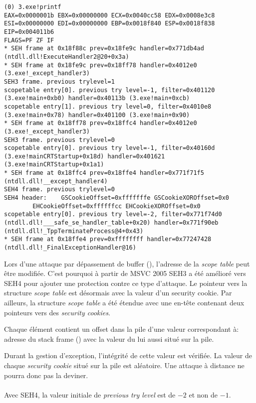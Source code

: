 \begin{lstlisting}[caption=tracer.exe output]
(0) 3.exe!printf
EAX=0x0000001b EBX=0x00000000 ECX=0x0040cc58 EDX=0x0008e3c8
ESI=0x00000000 EDI=0x00000000 EBP=0x0018f840 ESP=0x0018f838
EIP=0x004011b6
FLAGS=PF ZF IF
* SEH frame at 0x18f88c prev=0x18fe9c handler=0x771db4ad (ntdll.dll!ExecuteHandler2@20+0x3a)
* SEH frame at 0x18fe9c prev=0x18ff78 handler=0x4012e0 (3.exe!_except_handler3)
SEH3 frame. previous trylevel=1
scopetable entry[0]. previous try level=-1, filter=0x401120 (3.exe!main+0xb0) handler=0x40113b (3.exe!main+0xcb)
scopetable entry[1]. previous try level=0, filter=0x4010e8 (3.exe!main+0x78) handler=0x401100 (3.exe!main+0x90)
* SEH frame at 0x18ff78 prev=0x18ffc4 handler=0x4012e0 (3.exe!_except_handler3)
SEH3 frame. previous trylevel=0
scopetable entry[0]. previous try level=-1, filter=0x40160d (3.exe!mainCRTStartup+0x18d) handler=0x401621 (3.exe!mainCRTStartup+0x1a1)
* SEH frame at 0x18ffc4 prev=0x18ffe4 handler=0x771f71f5 (ntdll.dll!__except_handler4)
SEH4 frame. previous trylevel=0
SEH4 header:	GSCookieOffset=0xfffffffe GSCookieXOROffset=0x0
		EHCookieOffset=0xffffffcc EHCookieXOROffset=0x0
scopetable entry[0]. previous try level=-2, filter=0x771f74d0 (ntdll.dll!___safe_se_handler_table+0x20) handler=0x771f90eb (ntdll.dll!_TppTerminateProcess@4+0x43)
* SEH frame at 0x18ffe4 prev=0xffffffff handler=0x77247428 (ntdll.dll!_FinalExceptionHandler@16)
\end{lstlisting}


\myindex{\BufferOverflow}
Lors d'une attaque par dépassement de buffer (), l'adresse de la
\emph{scope table} peut être modifiée. C'est pourquoi à partir de MSVC 2005 SEH3 a été amélioré vers
SEH4 pour ajouter une protection contre ce type d'attaque.
Le pointeur vers la structure \emph{scope table} est désormais  avec la valeur
d'un \gls{security cookie}.
Par ailleurs, la structure \emph{scope table} a été étendue avec une en-tête contenant deux pointeurs
vers des \emph{security cookies}.

Chaque élément contient un offset dans la pile d'une valeur correspondant à:
adresse du \gls{stack frame} (\EBP)  avec la valeur du 
lui aussi situé sur la pile.

Durant la gestion d'exception, l'intégrité de cette valeur est vérifiée.
La valeur de chaque \emph{security cookie} situé sur la pile est aléatoire. Une attaque à distance ne
pourra donc pas la deviner. \\
\\
Avec SEH4, la valeur initiale de \emph{previous try level} est de $-2$ et non de $-1$.

